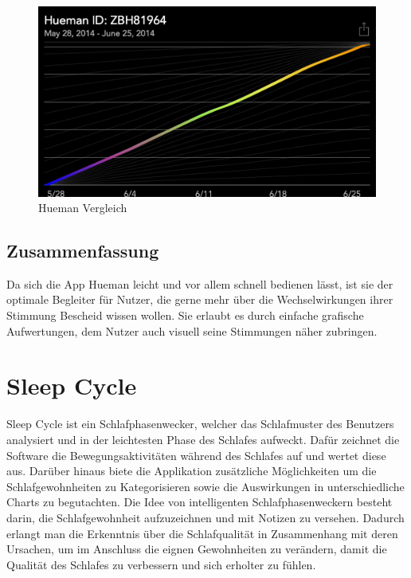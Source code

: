 \begin{figure}[H]
 \centering
 \includegraphics[scale=0.3]{images/hueman-matched-data.PNG}
 \caption{Hueman Vergleich \cite{fig:Vergleich}}
 \label{fig:Vergleich}
\end{figure}


\subsection{Zusammenfassung}
\label{ch:Apps:sec:Hueman:subsec:Verdict}

Da sich die App Hueman leicht und vor allem schnell bedienen lässt, ist sie der optimale Begleiter für Nutzer, die gerne mehr über die Wechselwirkungen ihrer Stimmung Bescheid wissen wollen.
Sie erlaubt es durch einfache grafische Aufwertungen, dem Nutzer auch visuell seine Stimmungen näher zubringen.  


\section{Sleep Cycle}
\label{ch:Apps:sec:SleepCycle}

Sleep Cycle ist ein Schlafphasenwecker, welcher das Schlafmuster des Benutzers analysiert und in der leichtesten Phase des Schlafes aufweckt. \cite{web:SleepCycle}
Dafür zeichnet die Software die Bewegungsaktivitäten während des Schlafes auf und wertet diese aus.
Darüber hinaus biete die Applikation zusätzliche Möglichkeiten um die Schlafgewohnheiten zu Kategorisieren sowie die Auswirkungen in unterschiedliche Charts zu begutachten. 
Die Idee von intelligenten Schlafphasenweckern besteht darin, die Schlafgewohnheit aufzuzeichnen und mit Notizen zu versehen. Dadurch erlangt man die Erkenntnis über die Schlafqualität in Zusammenhang mit deren Ursachen, um im Anschluss die eignen Gewohnheiten zu verändern, damit die Qualität des Schlafes zu verbessern und sich erholter zu fühlen.


